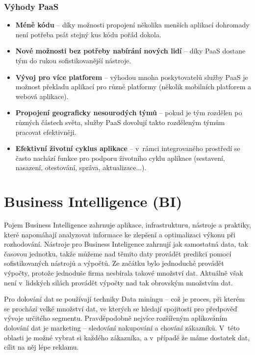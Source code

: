 \subsubsection{Výhody PaaS}
\begin{itemize}
\item \textbf{Méně kódu} -- díky možnosti propojení několika menších aplikací dohromady není potřeba psát stejný kus kódu pořád dokola.
\item \textbf{Nové možnosti bez potřeby nabírání nových lidí} -- díky PaaS dostane tým do rukou sofistikovanější nástroje.
\item \textbf{Vývoj pro více platforem} -- výhodou mnoha poskytovatelů služby PaaS je možnost překladu aplikací pro různé platformy (několik mobilních platforem a webová aplikace).
\item \textbf{Propojení geograficky nesourodých týmů} -- pokud je tým rozdělen po různých částech světa, služby PaaS dovolují takto rozděleným týmům pracovat efektivněji.
\item \textbf{Efektivní životní cyklus aplikace} -- v~rámci integrovaného prostředí se často nachází funkce pro podporu životního cyklu aplikace (sestavení, nasazení, otestování, správa, aktualizace...). \cite{co-je-paas}
\end{itemize}

\section{Business Intelligence (BI)}
\par Pojem Business Intelligence zahrnuje aplikace, infrastrukturu, nástroje a praktiky, které napomáhají analyzovat informace ke zlepšení a optimalizaci výkonu při rozhodování. Nástroje pro Business Inteligence zahrnují jak samostatná data, tak časovou jednotku, takže můžeme nad těmito daty provádět predikci pomocí sofistikovaných nástrojů a výpočtů. Ze začátku bylo jednoduché provádět výpočty, protože jednoduše firma nesbírala takové množství dat. Aktuálně však není v~lidských silách provádět výpočty nad tak obrovským množstvím dat. \cite{data-science-business}

\par Pro dolování dat se používají techniky Data miningu -- což je proces, při kterém se prochází velké množství dat, ve kterých se hledají spojitosti pro předpověď vývoje určitého segmentu. Pravděpodobně nejvíce rozšířeným aplikováním dolování dat je marketing -- sledování nakupování a chování zákazníků. V~této oblasti je možné vybrat si každého zákazníka, a v~případě že máme dostatek dat, cílit na něj lépe reklamu. \cite{data-science-business}

